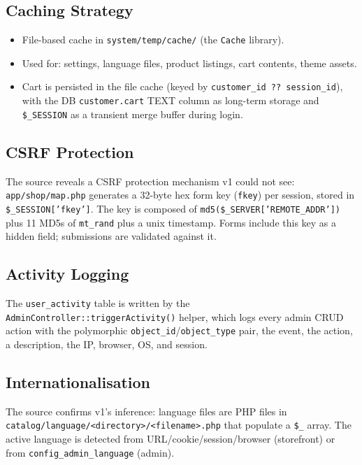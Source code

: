 \documentclass[11pt,a4paper]{article}
\begin{document}
\subsection{Caching Strategy}

\begin{itemize}[leftmargin=1.6em,itemsep=2pt]
  \item File-based cache in \texttt{system/temp/cache/} (the
        \texttt{Cache} library).
  \item Used for: settings, language files, product listings,
        cart contents, theme assets.
  \item Cart is persisted in the file cache (keyed by
        \texttt{customer\_id ?? session\_id}), with the DB
        \texttt{customer.cart} TEXT column as long-term storage
        and \texttt{\$\_SESSION} as a transient merge buffer
        during login.
\end{itemize}

\subsection{CSRF Protection}

The source reveals a CSRF protection mechanism v1 could not see:
\texttt{app/shop/map.php} generates a 32-byte hex form key
(\texttt{fkey}) per session, stored in
\texttt{\$\_SESSION['fkey']}. The key is composed of
\texttt{md5(\$\_SERVER['REMOTE\_ADDR'])} plus 11 MD5s of
\texttt{mt\_rand} plus a unix timestamp. Forms include this key as
a hidden field; submissions are validated against it.

\subsection{Activity Logging}

The \texttt{user\_activity} table is written by the
\texttt{AdminController::triggerActivity()} helper, which logs
every admin CRUD action with the polymorphic
\texttt{object\_id}/\texttt{object\_type} pair, the event, the
action, a description, the IP, browser, OS, and session.

\subsection{Internationalisation}

The source confirms v1's inference: language files are PHP files
in \texttt{catalog/language/<directory>/<filename>.php} that
populate a \texttt{\$\_} array. The active language is detected
from URL/cookie/session/browser (storefront) or from
\texttt{config\_admin\_language} (admin).
\end{document}
